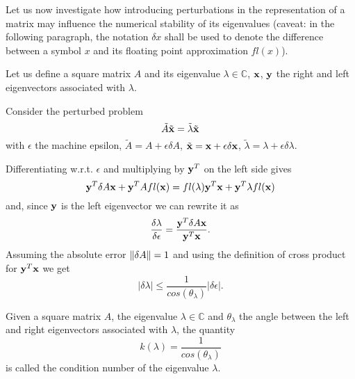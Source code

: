 Let us now investigate how introducing perturbations in the representation of a matrix may influence the numerical stability of its
eigenvalues (caveat: in the following paragraph, the notation \(\delta x\) shall be used to denote the difference between a symbol
\(x\) and its floating point approximation \(fl(x)\)).

Let us define a square matrix \(A\) and its eigenvalue \(\lambda \in \mathbb{C}\), \(\vb{x}\), \(\vb{y}\) the right
and left eigenvectors associated with \(\lambda\).

Consider the perturbed problem
\[
    \tilde{A} \tilde{\vb{x}} = \tilde{\lambda} \tilde{\vb{x}}
\]
with \(\epsilon\) the machine epsilon, \(\tilde{A} = A + \epsilon\delta A\), \(\tilde{\vb{x}} = \vb{x} + \epsilon\delta \vb{x}\),
\(\tilde{\lambda} = \lambda + \epsilon\delta \lambda\).

Differentiating w.r.t. \(\epsilon\) and multiplying by \(\vb{y}^T\) on the left side gives
\[
    \vb{y}^T \delta A \vb{x} + \vb{y}^T A fl(\vb{x}) = fl(\lambda) \vb{y}^T \vb{x} + \vb{y}^T \lambda fl(\vb{x})
\]
and, since \(\vb{y}\) is the left eigenvector we can rewrite it as
\[
    \dfrac{\delta \lambda}{\delta \epsilon} = \dfrac{\vb{y}^T \delta A \vb{x}}{\vb{y}^T \vb{x}}.
\]
Assuming the absolute error \(\norm{\delta A} = 1\) and using the definition of cross product for \(\vb{y}^T \vb{x}\) we get
\[
    \vert \delta \lambda \vert \leq \dfrac{1}{cos(\theta_{\lambda})} \vert \delta \epsilon \vert.
\]

\begin{theorem}
    Given a square matrix \(A\), the eigenvalue \(\lambda \in \mathbb{C}\) and \(\theta_{\lambda}\) the angle between the left and right
    eigenvectors associated with \(\lambda\), the quantity
    \[k(\lambda) = \dfrac{1}{cos(\theta_{\lambda})}\]
    is called the condition number of the eigenvalue \(\lambda\).
\end{theorem}
    
